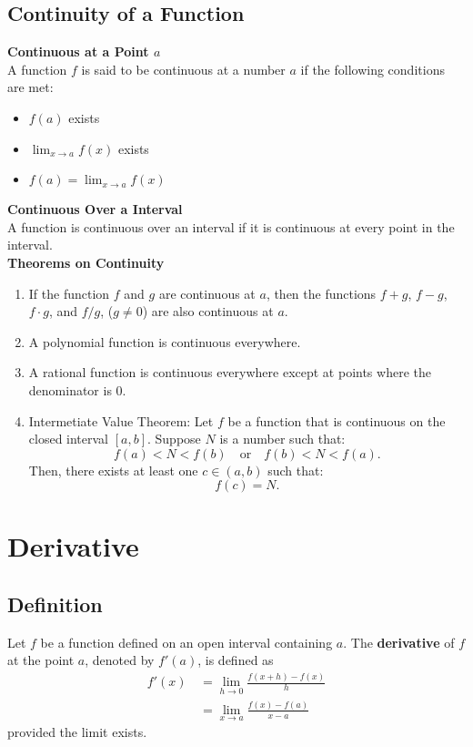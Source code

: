 \documentclass[11pt]{article}
\begin{document}
\subsection{Continuity of a Function}
\textbf{Continuous at a Point $a$}\\
A function $f$ is said to be continuous at a number $a$
if the following conditions are met:
\begin{itemize}
    \item $f(a)$ exists
    \item $\displaystyle\lim_{x\to a}f(x)$ exists
    \item $\displaystyle f(a) = \lim_{x\to a}f(x)$
\end{itemize}
\textbf{Continuous Over a Interval}\\
A function is continuous over an interval if it is continuous at every point in the interval.\\[.5em]
\textbf{Theorems on Continuity}
\begin{enumerate}
    \item If the function $f$ and $g$ are continuous at $a$, 
        then the functions $f+g$, $f-g$, $f\cdot g$, and $f/g$, ($g \neq 0$) are also continuous at $a$.
    \item A polynomial function is continuous everywhere.
    \item A rational function is continuous everywhere except at points where the denominator is $0$.
    \item Intermetiate Value Theorem: 
            Let $f$ be a function that is continuous on the closed interval $[a, b]$. Suppose $N$ is a number such that:
            \[
                f(a) < N < f(b) \quad \text{or} \quad f(b) < N < f(a).
            \]
            Then, there exists at least one $c \in (a, b)$ such that:
            \[
                f(c) = N.
            \]
\end{enumerate}

\section{Derivative}
\subsection{Definition}
Let $f$ be a function defined on an open interval containing $a$.  
The \textbf{derivative} of $f$ at the point $a$, denoted by $f'(a)$, is defined as
\begin{align*}
    f'(x)\,&=\lim_{h \to 0} \frac{f(x + h)-f(x)}{h}\\
        &=\lim_{x \to a}\frac{f(x)-f(a)}{x-a}
\end{align*}
\noindent
provided the limit exists.\\[.5em]
\end{document}
